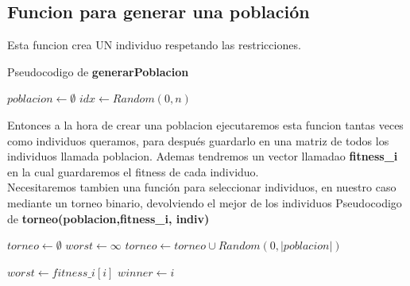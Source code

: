 \subsection{Funcion para generar una población}

Esta funcion crea UN individuo respetando las restricciones.

Pseudocodigo de \textbf{generarPoblacion}
\begin{algorithm}[H]
  \begin{algorithmic}[1]
      \State $poblacion \gets \emptyset $
       
        \State $idx \gets Random(0,n)$ 
        \EndIf
      \EndWhile
      \State {}
    \EndFunction
  \end{algorithmic}
\end{algorithm}

Entonces a la hora de crear una poblacion ejecutaremos esta funcion tantas veces como individuos queramos, para después
guardarlo en una matriz de todos los individuos llamada poblacion.
Ademas tendremos un vector llamadao \textbf{fitness\_i} en la cual guardaremos el fitness de cada individuo.\\


Necesitaremos tambien una función para seleccionar individuos, en nuestro caso mediante un torneo binario, devolviendo
el mejor de los individuos
Pseudocodigo de \textbf{torneo(poblacion,fitness\_i, indiv)}
\begin{algorithm}[H]
  \begin{algorithmic}[1]
      \State $torneo \gets \emptyset $
      \State $worst \gets \infty$
       
        \State $torneo \gets torneo \cup Random(0,|poblacion|)$ 

      \EndWhile
          \State $worst \gets fitness\_i[i] $
          \State $winner \gets i$
        \EndIf
      \EndFor
      \State {}
    \EndFunction
  \end{algorithmic}
\end{algorithm}

